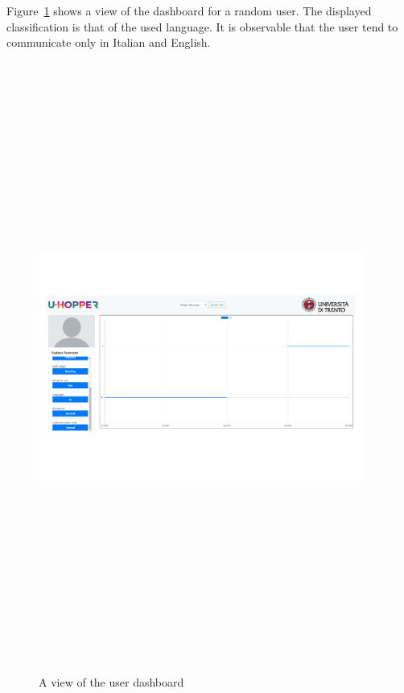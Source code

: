 Figure~\ref{fig:userDash} shows a view of the dashboard for a random user. The displayed classification is that of the used language. It is observable that the user tend to communicate only in Italian and English.

\begin{figure}[htp]
    \centering
    \includegraphics[width=%
    0.95\textwidth,height=20cm,keepaspectratio]{img/userDash}
    \caption{A view of the user dashboard}
    \label{fig:userDash}
\end{figure}